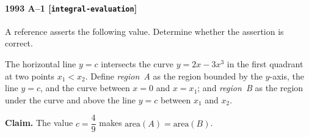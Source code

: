 \paragraph{1993 A--1 \textnormal{[\texttt{integral-evaluation}]}}
A reference asserts the following value. Determine whether the
assertion is correct.

The horizontal line $y = c$ intersects the curve $y = 2x - 3x^3$
in the first quadrant at two points $x_1 < x_2$. Define
\textsl{region~A} as the region bounded by the $y$-axis, the line
$y = c$, and the curve between $x = 0$ and $x = x_1$; and
\textsl{region~B} as the region under the curve and above the line
$y = c$ between $x_1$ and $x_2$.

\textbf{Claim.} The value $c = \dfrac{4}{9}$ makes
$\mathrm{area}(A) = \mathrm{area}(B)$.
